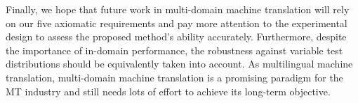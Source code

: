 Finally, we hope that future work in multi-domain machine translation will rely on our five axiomatic requirements and pay more attention to the experimental design to assess the proposed method's ability accurately. Furthermore, despite the importance of in-domain performance, the robustness against variable test distributions should be equivalently taken into account. As multilingual machine translation, multi-domain machine translation is a promising paradigm for the MT industry and still needs lots of effort to achieve its long-term objective.





























































































